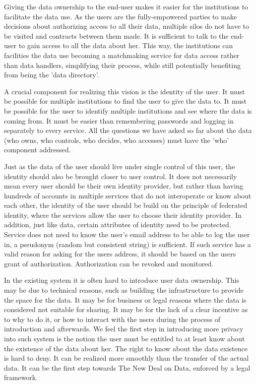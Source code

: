 Giving the data ownership to the end-user makes it easier for the institutions to facilitate the data use.
As the users are the fully-empowered parties to make decisions about authorizing access to all their data, multiple silos do not have to be visited and contracts between them made.
It is sufficient to talk to the end-user to gain access to all the data about her.
This way, the institutions can facilities the data use becoming a matchmaking service for data access rather than data handlers, simplifying their process, while still potentially benefiting from being the 'data directory'.

A crucial component for realizing this vision is the identity of the user.
It must be possible for multiple institutions to find the user to give the data to.
It must be possible for the user to identify multiple institutions and see where the data is coming from.
It must be easier than remembering passwords and logging in separately to every service.
All the questions we have asked so far about the data (who owns, who controls, who decides, who accesses) must have the 'who' component addressed.

Just as the data of the user should live under single control of this user, the identity should also be brought closer to user control.
It does not necessarily mean every user should be their own identity provider, but rather than having hundreds of accounts in multiple services that do not interoperate or know about each other, the identity of the user should be build on the principle of federated identity, where the services allow the user to choose their identity provider.
In addition, just like data, certain attributes of identity need to be protected.
Service does not need to know the user's email address to be able to log the user in, a pseudonym (random but consistent string) is sufficient.
If such service has a valid reason for asking for the users address, it should be based on the users grant of authorization.
Authorization can be revoked and monitored.

In the existing system it is often hard to introduce user data ownership.
This may be due to technical reasons, such as building the infrastructure to provide the space for the data.
It may be for business or legal reasons where the data is considered not suitable for sharing.
It may be for the lack of a clear incentive as to why to do it, or how to interact with the users during the process of introduction and afterwards.
We feel the first step in introducing more privacy into such system is the notion the user must be entitled to at least know about the existence of the data about her.
The right to know about the data existence is hard to deny. It can be realized more smoothly than the transfer of the actual data.
It can be the first step towards The New Deal on Data, enforced by a legal framework.
